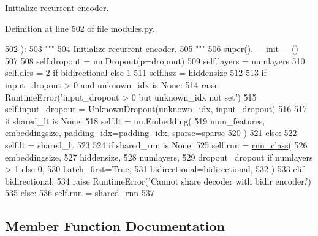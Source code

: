 \begin{DoxyVerb}Initialize recurrent encoder.
\end{DoxyVerb}
 

Definition at line 502 of file modules.\+py.


\begin{DoxyCode}
502     ):
503         \textcolor{stringliteral}{"""}
504 \textcolor{stringliteral}{        Initialize recurrent encoder.}
505 \textcolor{stringliteral}{        """}
506         super().\_\_init\_\_()
507 
508         self.dropout = nn.Dropout(p=dropout)
509         self.layers = numlayers
510         self.dirs = 2 \textcolor{keywordflow}{if} bidirectional \textcolor{keywordflow}{else} 1
511         self.hsz = hiddensize
512 
513         \textcolor{keywordflow}{if} input\_dropout > 0 \textcolor{keywordflow}{and} unknown\_idx \textcolor{keywordflow}{is} \textcolor{keywordtype}{None}:
514             \textcolor{keywordflow}{raise} RuntimeError(\textcolor{stringliteral}{'input\_dropout > 0 but unknown\_idx not set'})
515         self.input\_dropout = UnknownDropout(unknown\_idx, input\_dropout)
516 
517         \textcolor{keywordflow}{if} shared\_lt \textcolor{keywordflow}{is} \textcolor{keywordtype}{None}:
518             self.lt = nn.Embedding(
519                 num\_features, embeddingsize, padding\_idx=padding\_idx, sparse=sparse
520             )
521         \textcolor{keywordflow}{else}:
522             self.lt = shared\_lt
523 
524         \textcolor{keywordflow}{if} shared\_rnn \textcolor{keywordflow}{is} \textcolor{keywordtype}{None}:
525             self.rnn = \hyperlink{namespaceseq2seq_1_1train_a1b062073c766f1d34a67f572ef256ba0}{rnn\_class}(
526                 embeddingsize,
527                 hiddensize,
528                 numlayers,
529                 dropout=dropout \textcolor{keywordflow}{if} numlayers > 1 \textcolor{keywordflow}{else} 0,
530                 batch\_first=\textcolor{keyword}{True},
531                 bidirectional=bidirectional,
532             )
533         \textcolor{keywordflow}{elif} bidirectional:
534             \textcolor{keywordflow}{raise} RuntimeError(\textcolor{stringliteral}{'Cannot share decoder with bidir encoder.'})
535         \textcolor{keywordflow}{else}:
536             self.rnn = shared\_rnn
537 
\end{DoxyCode}


\subsection{Member Function Documentation}
\mbox{\label{classprojects_1_1controllable__dialogue_1_1controllable__seq2seq_1_1modules_1_1RNNEncoder_aff331ac57c336c48e5853f16edacb6db}} 

